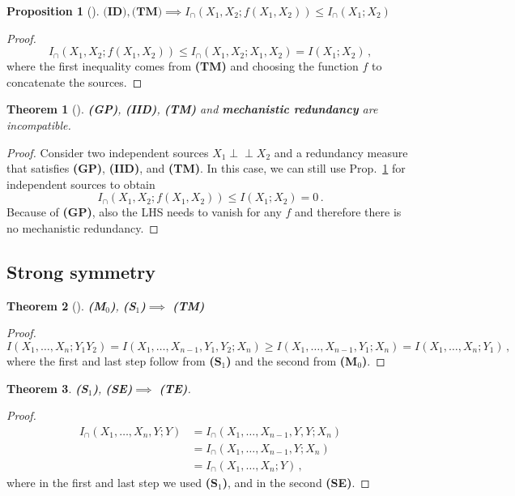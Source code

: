 \documentclass{article}
\newcommand{\ts}[1]{\ensuremath{_{\text{#1}}}}
\newcommand{\ind}{\mathrel{\perp\!\!\!\perp}}
\newcommand{\Xs}{X_1,\ldots,X_n}
\newcommand{\Xsm}{X_1,\ldots,X_{n-1}}
\newcommand{\Mz}{\textbf{(M\ts{0})}\xspace} %
\newcommand{\GP}{\textbf{(GP)}\xspace} %
\newcommand{\ID}{\textbf{(ID)}\xspace} %
\newcommand{\IID}{\textbf{(IID)}\xspace} %
\newcommand{\TM}{\textbf{(TM)}\xspace} %
\newcommand{\So}{\textbf{(S\ts{1})}\xspace} %
\newcommand{\TE}{\textbf{(TE)}\xspace} %
\newcommand{\SE}{\textbf{(SE)}\xspace} %
\newtheorem{theorem}{Theorem}
\newtheorem{proposition}{Proposition}
\begin{document}
\begin{proposition}[\!\!\cite{banerjee2015synergy}] \label{prop:ID-TM--ineq}
    $\ID, \TM \implies I_\cap(X_1,X_2;f(X_1,X_2))\leq I_\cap(X_1;X_2)$
\end{proposition}
\begin{proof}
    \begin{equation}
        I_\cap(X_1,X_2;f(X_1,X_2))\leq I_\cap(X_1,X_2;X_1,X_2) = I(X_1;X_2)\,,
    \end{equation}
    where the first inequality comes from \TM and choosing the function $f$ to concatenate the sources.
\end{proof}

\begin{theorem}[\!\!\cite{rauh2017extractable, james2018unique}] \label{theo:noGP-IID-TM-Mech}
    \GP, \IID, \TM and \textbf{mechanistic redundancy} are incompatible.
\end{theorem}
\begin{proof}
    Consider two independent sources $X_1\ind X_2$ and a redundancy measure that satisfies \GP, \IID, and \TM. In this case, we can still use Prop.~\ref{prop:ID-TM--ineq} for independent sources to obtain
    \begin{equation}
        I_\cap(X_1,X_2;f(X_1,X_2))\leq I(X_1;X_2) = 0\,.
    \end{equation}
    Because of \GP, also the LHS needs to vanish for any $f$ and therefore there is no mechanistic redundancy. 
\end{proof}

\subsection{Strong symmetry}

\begin{theorem}[\!\!\cite{bertschinger2013shared}] \label{theo:Mz-So--TM}
    \Mz, \So $\implies$ \TM 
\end{theorem}
\begin{proof}
    \begin{equation}
        I(\Xs;Y_1Y_2) = I(X_1,\ldots,X_{n-1},Y_1,Y_2;X_n)\geq I(X_1,\ldots,X_{n-1},Y_1;X_n) = I(\Xs;Y_1)\,,
    \end{equation}
    where the first and last step follow from \So and the second from \Mz.
\end{proof}


\begin{theorem} \label{theo:S1-SE--TE}
    \So, \SE $\implies$ \TE.
\end{theorem}
\begin{proof}
    \begin{equation}
    \begin{aligned}
        I_\cap(\Xs,Y;Y) & = I_\cap(\Xsm,Y,Y;X_n) \\
        & = I_\cap(\Xsm,Y;X_n) \\
        & = I_\cap(\Xs;Y) \,,
    \end{aligned}
    \end{equation}
    where in the first and last step we used \So, and in the second \SE.
\end{proof}
\end{document}
